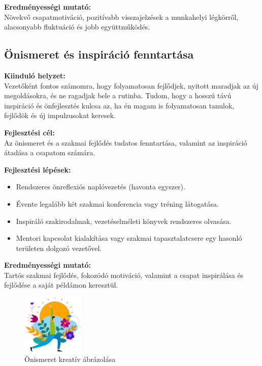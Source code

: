 \textbf{Eredményességi mutató:} \\
Növekvő csapatmotiváció, pozitívabb visszajelzések a munkahelyi légkörről, alacsonyabb fluktuáció és jobb együttműködés.

\subsection{Önismeret és inspiráció fenntartása}

\textbf{Kiinduló helyzet:} \\
Vezetőként fontos számomra, hogy folyamatosan fejlődjek, nyitott maradjak az új megoldásokra, és ne ragadjak bele a rutinba.
Tudom, hogy a hosszú távú inspiráció és önfejlesztés kulcsa az, ha én magam is folyamatosan tanulok, 
fejlődök és új impulzusokat keresek.

\textbf{Fejlesztési cél:} \\
Az önismeret és a szakmai fejlődés tudatos fenntartása, valamint az inspiráció átadása a csapatom számára.

\textbf{Fejlesztési lépések:}
\begin{itemize}
    \item Rendszeres önreflexiós naplóvezetés (havonta egyszer).
    \item Évente legalább két szakmai konferencia vagy tréning látogatása.
    \item Inspiráló szakirodalmak, vezetéselméleti könyvek rendszeres olvasása.
    \item Mentori kapcsolat kialakítása vagy szakmai tapasztalatcsere egy hasonló területen dolgozó vezetővel.
\end{itemize}

\textbf{Eredményességi mutató:} \\
Tartós szakmai fejlődés, fokozódó motiváció, valamint a csapat inspirálása és fejlődése a saját példámon keresztül.
\begin{figure}[H]
	\centering
    \includegraphics[width=30mm, keepaspectratio]{figures/self_knowledge.jpg}
    \caption{Önismeret kreatív ábrázolása}
    \label {fig:self_knowledge}
\end{figure}
